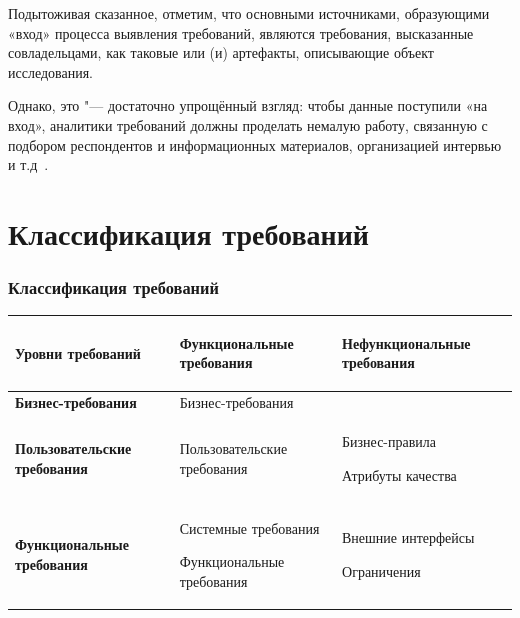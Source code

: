 \documentclass{../industrial-development}
\begin{document}
Подытоживая сказанное, отметим, что основными источниками, образующими «вход» процесса выявления требований, являются требования, высказанные совладельцами, как таковые или (и) артефакты, описывающие объект исследования.

Однако, это "--- достаточно упрощённый взгляд: чтобы данные поступили «на вход», аналитики требований должны проделать немалую работу, связанную с подбором респондентов и информационных материалов, организацией интервью и т.д~\cite[с.~29--30]{Maglinec}.


\section{Классификация требований}
\begin{frame} \frametitle{Классификация требований}
 \begin{table}[h]
\begin{center}
\begin{tabular}{|p{3cm}|p{}|p{3cm}|}
\hline
\begin{center} \tiny \textbf{Уровни требований} \end{center} & \begin{center} \tiny \textbf{Функциональные требования} \end{center} & \begin{center} \tiny \textbf{Нефункциональные \newline требования} \end{center} \\
\hline

 \tiny \textbf{Бизнес-требования} & \tiny Бизнес-требования & \\
\hline

\tiny \textbf{Пользовательские \newline требования} & \tiny Пользовательские требования & 
\tiny Бизнес-правила 

\tiny Атрибуты качества \\
\hline

\tiny \textbf{Функциональные \newline требования} & \tiny Системные требования 

 \tiny Функциональные требования

 & \tiny Внешние интерфейсы

 \tiny Ограничения

\\ 
\hline
\end{tabular}
\end{center}
\end{table}

\end{frame}
\end{document}
